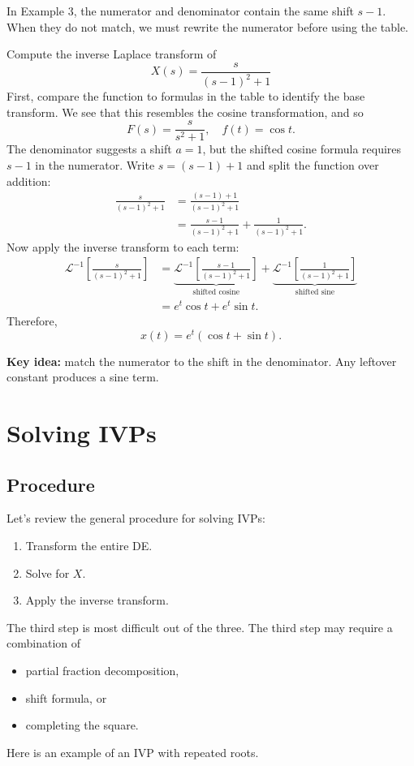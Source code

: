 \documentclass[10pt,letterpaper]{article}
\begin{document}
In Example 3, the numerator and denominator contain
the same shift $s-1$. When they do not match,
we must rewrite the numerator before using the table.

\begin{example}[4]{
Compute the inverse Laplace transform of 
\[
X(s)=
\frac{s}{(s-1)^2+1}
\]
}
First, compare the function to formulas in the table to identify the base transform. We see that this resembles the cosine transformation, and so 
$$
    F(s)=\frac{s}{s^2+1}, \quad f(t)=\cos t.
$$
The denominator suggests a shift $a=1$, but the
shifted cosine formula requires $s-1$ in the numerator.
Write $s=(s-1)+1$ and split the function over addition:
\begin{align*}
\frac{s}{(s-1)^2+1}
&=\frac{(s-1)+1}{(s-1)^2+1}\\
&=\frac{s-1}{(s-1)^2+1} 
+\frac{1}{(s-1)^2+1}.
\end{align*}
Now apply the inverse transform to each term:
\begin{align*}
\mathcal{L}^{-1}\left[\frac{s}{(s-1)^2+1}\right]
&=
\underbrace{\mathcal{L}^{-1}
\left[\frac{s-1}{(s-1)^2+1}\right]}_{\text{shifted cosine}}
+
\underbrace{\mathcal{L}^{-1}
\left[\frac{1}{(s-1)^2+1}\right]}_{\text{shifted sine}}\\
&=e^t\cos t+e^t\sin t.
\end{align*}
Therefore,
\[
\boxed{x(t)=e^t(\cos t+\sin t).}
\]
\end{example}

\textbf{Key idea:} match the numerator to the shift
in the denominator. Any leftover constant produces
a sine term.

\section{Solving IVPs}

\subsection{Procedure}
Let's review the general procedure for solving IVPs:
\begin{enumerate}
    \item Transform the entire DE.
    \item Solve for $X$. 
    \item Apply the inverse transform.
\end{enumerate}
The third step is most difficult out of the three. The third step may require a combination of 
\begin{itemize}
    \item partial fraction decomposition,
    \item shift formula, or
    \item completing the square.
\end{itemize}
Here is an example of an IVP with repeated roots.
\end{document}
